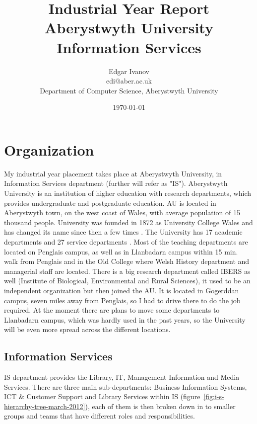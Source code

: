 \documentclass[10pt,a4paper,headinclude=true]{report}
\begin{document}
\onehalfspacing
\title{Industrial Year Report \\ Aberystwyth University Information Services}
\author{Edgar Ivanov\\ edi@aber.ac.uk \\ Department of Computer Science, Aberystwyth University}
\date{\today}

\maketitle

\tableofcontents

\chapter{Organization}
My industrial year placement takes place at Aberystwyth University, in Information Services department (further will refer as "IS"). Aberystwyth University is an institution of higher education with research departments, which provides undergraduate and postgraduate education. AU is located in Aberystwyth town, on the west coast of Wales, with average population of 15 thousand people. University was founded in 1872 as University College Wales and has changed its name since then a few times \cite{History}.
The University has 17 academic departments and 27 service departments \cite{Departments} \cite{Departments2}. Most of the teaching departments are located on Penglais campus, as well as in Llanbadarn campus within 15 min. walk from Penglais and in the Old College where Welsh History department and managerial staff are located. There is a big research department called IBERS as well (Institute of Biological, Environmental and Rural Sciences), it used to be an independent organization but then joined the AU. It is located in Gogerddan campus, seven miles away from Penglais, so I had to drive there to do the job required. At the moment there are plans to move some departments to Llanbadarn campus, which was hardly used in the past years, so the University will be even more spread across the different locations.

\section{Information Services}
IS department provides the Library, IT, Management Information and Media Services. There are three main sub-departments: Business Information Systems, ICT \& Customer Support and Library Services within IS (figure~\ref{fig:i-s-hierarchy-tree-march-2012}), each of them is then broken down in to smaller groups and teams that have different roles and responsibilities.
\end{document}
